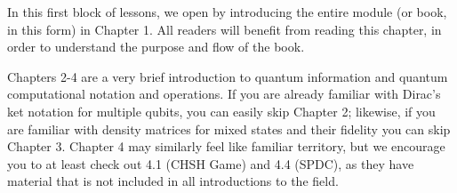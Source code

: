 
\begin{partintro}
In this first block of lessons, we open by introducing the entire module (or book, in this form) in Chapter 1.  All readers will benefit from reading this chapter, in order to understand the purpose and flow of the book.

Chapters 2-4 are a very brief introduction to quantum information and quantum computational notation and operations.  If you are already familiar with Dirac's ket notation for multiple qubits, you can easily skip Chapter 2; likewise, if you are familiar with density matrices for mixed states and their fidelity you can skip Chapter 3. Chapter 4 may similarly feel like familiar territory, but we encourage you to at least check out 4.1 (CHSH Game) and 4.4 (SPDC), as they have material that is not included in all introductions to the field.
\end{partintro}
